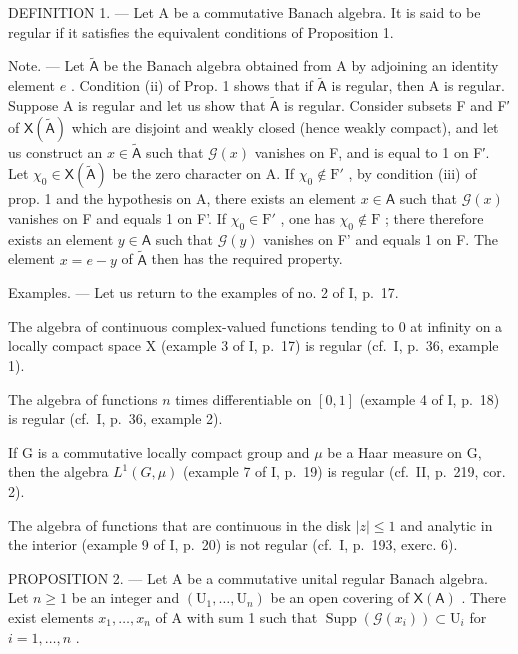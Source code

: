 DEFINITION 1. --- Let A be a commutative Banach algebra. It is said to be regular if it satisfies the equivalent conditions of Proposition 1.

Note. --- Let \(\tilde{\mathsf{A}}\) be the Banach algebra obtained from A by adjoining an identity element \(e\) . Condition (ii) of Prop. 1 shows that if \(\tilde{\mathsf{A}}\) is regular, then A is regular. Suppose A is regular and let us show that \(\tilde{\mathsf{A}}\) is regular. Consider subsets F and F′ of \(\mathsf{X}(\tilde{\mathsf{A}})\) which are disjoint and weakly closed (hence weakly compact), and let us construct an \(x \in \tilde{\mathsf{A}}\) such that \(\mathcal{G}(x)\) vanishes on F, and is equal to 1 on F′. Let \(\chi_0 \in \mathsf{X}(\tilde{\mathsf{A}})\) be the zero character on A. If \(\chi_0 \notin \mathrm{F}'\) , by condition (iii) of prop. 1 and the hypothesis on A, there exists an element \(x \in \mathsf{A}\) such that \(\mathcal{G}(x)\) vanishes on F and equals 1 on F'. If \(\chi_0 \in \mathrm{F}'\) , one has \(\chi_0 \notin \mathrm{F}\) ; there therefore exists an element \(y \in \mathsf{A}\) such that \(\mathcal{G}(y)\) vanishes on F' and equals 1 on F. The element \(x = e - y\) of \(\tilde{\mathsf{A}}\) then has the required property.

Examples. --- Let us return to the examples of no. 2 of I, p.~17.

The algebra of continuous complex-valued functions tending to 0 at infinity on a locally compact space X (example 3 of I, p.~17) is regular (cf.~I, p.~36, example 1).

The algebra of functions \(n\) times differentiable on \([0, 1]\) (example 4 of I, p.~18) is regular (cf.~I, p.~36, example 2).

If G is a commutative locally compact group and \(\mu\) be a Haar measure on G, then the algebra \(L^{1}(G,\mu)\) (example 7 of I, p.~19) is regular (cf.~II, p.~219, cor. 2).

The algebra of functions that are continuous in the disk \(|z| \leqslant 1\) and analytic in the interior (example 9 of I, p.~20) is not regular (cf.~I, p.~193, exerc. 6).

PROPOSITION 2. --- Let A be a commutative unital regular Banach algebra. Let \(n \geqslant 1\) be an integer and \((\mathrm{U}_{1}, \ldots, \mathrm{U}_{n})\) be an open covering of \(\mathsf{X}(\mathsf{A})\) . There exist elements \(x_{1}, \ldots, x_{n}\) of A with sum 1 such that \(\operatorname{Supp}(\mathcal{G}(x_{i})) \subset \mathrm{U}_{i}\) for \(i = 1, \ldots, n\) .

